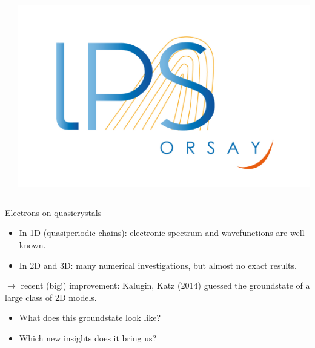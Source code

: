 \documentclass[xcolor=x11names,compress,professionalfonts, aspectratio=169]{beamer}
\renewcommand{\(}{\begin{columns}}
\renewcommand{\)}{\end{columns}}
\newcommand{\<}[1]{\begin{column}{#1}}
\renewcommand{\>}{\end{column}}
\begin{document}
\begin{frame}
\begin{columns}
\begin{column}{6cm}
\end{column}
\begin{column}{2cm}
~\\
~\\
~\\
~\\
\raggedleft
\includegraphics[scale=.15]{img/logo-lps.jpg}
\end{column}
\end{columns}
\end{frame}

\begin{frame}{Electrons on quasicrystals}
\begin{itemize}
	\item In 1D (quasiperiodic chains): electronic spectrum and wavefunctions are well known. 
	\item In 2D and 3D: many numerical investigations, but almost no exact results.
\end{itemize}
$\rightarrow$ recent (big!) improvement: Kalugin, Katz (2014) guessed the groundstate of a large class of 2D models.

\begin{itemize}
	\item What does this groundstate look like?
	\item Which new insights does it bring us?
\end{itemize} 
\end{frame}
\end{document}
